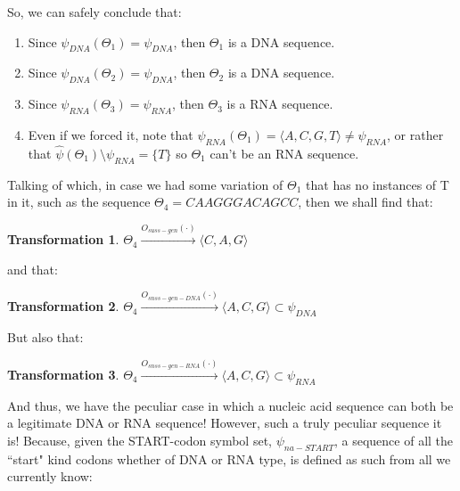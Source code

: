 \documentclass[a4paper, 18pt]{book} %
\newtheorem{trans}{Transformation}
\begin{document}
So, we can safely conclude that:

\begin{enumerate}
\item Since $\psi_{DNA}(\Theta_1) = \psi_{DNA}$, then $\Theta_1$ is a DNA sequence.
\item Since $\psi_{DNA}(\Theta_2) = \psi_{DNA}$, then $\Theta_2$ is a DNA sequence.
\item Since $\psi_{RNA}(\Theta_3) = \psi_{RNA}$, then $\Theta_3$ is a RNA sequence.
\item Even if we forced it, note that $\psi_{RNA}(\Theta_1) = \langle A, C, G, T \rangle \neq \psi_{RNA}$, or rather that $\hat{\psi}(\Theta_1) \setminus \psi_{RNA} = \{T\}$ so $\Theta_1$ can't be an RNA sequence.
\end{enumerate} 

Talking of which, in case we had some variation of $\Theta_1$ that has no instances of T in it, such as the sequence $\Theta_4 = CAAGGGACAGCC$, then we shall find that:

\begin{trans}
$\Theta_4 \xrightarrow{O_{suss-gen}(\cdot)} \langle C, A, G \rangle$
\end{trans}

and that:

\begin{trans}
$\Theta_4 \xrightarrow{O_{snss-gen-DNA}(\cdot)} \langle A, C, G \rangle \subset \psi_{DNA}$
\end{trans}

But also that:

\begin{trans}
$\Theta_4 \xrightarrow{O_{snss-gen-RNA}(\cdot)} \langle A, C, G \rangle \subset \psi_{RNA}$
\end{trans}

And thus, we have the peculiar case in which a nucleic acid sequence can both be a legitimate DNA or RNA sequence! However, such a truly peculiar sequence it is! Because, given the START-codon symbol set, $\psi_{na-START}$, a sequence of all the ``start" kind codons whether of DNA or RNA type, is defined as such from all we currently know:
\end{document}
